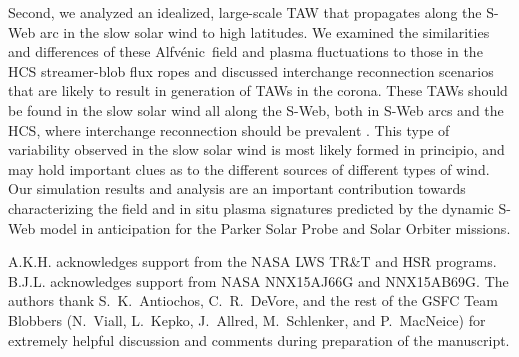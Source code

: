 \documentclass[preprint]{aastex62}
\newcommand{\Alfvenic}{Alfv\'{e}nic\ }
\newcommand{\red}[1]{\textcolor{red}{#1}}
\begin{document}
Second, we analyzed an idealized, large-scale TAW that propagates 
along the S-Web arc in the slow solar wind to high latitudes. We examined the similarities and 
differences of {these} \Alfvenic field and plasma fluctuations to those in the 
HCS streamer-blob  flux ropes and discussed interchange reconnection 
scenarios that are likely to result in generation of TAWs in the corona. These TAWs should be found in the slow solar wind all along the S-Web, both in S-Web arcs and the HCS, where interchange reconnection should be prevalent . This type of 
variability observed in the slow solar wind is most likely formed in principio, and may hold important clues as to the different sources of different types of wind. Our simulation results and analysis are an important {contribution} towards 
characterizing the field and in situ plasma signatures predicted by the 
\citet{Antiochos2011} dynamic S-Web model 
in anticipation for the Parker Solar Probe and Solar Orbiter missions. 



\acknowledgments

A.K.H. acknowledges support from the NASA LWS TR\&T and HSR programs. 
B.J.L. acknowledges support from NASA NNX15AJ66G and NNX15AB69G. 
The authors thank S.~K.~Antiochos, C.~R.~DeVore, and the rest of the GSFC 
Team Blobbers (N.~Viall, L.~Kepko, J.~Allred, M.~Schlenker, and P.~MacNeice) for 
extremely helpful discussion and comments during preparation of the manuscript.



%
\end{document}
